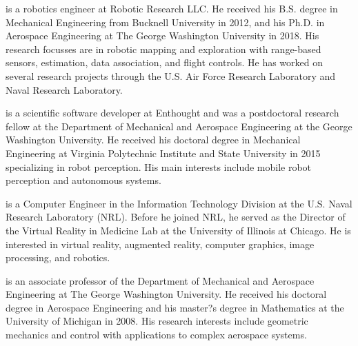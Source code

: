 \documentclass[smallextended]{svjour3}       %
\begin{document}



\vspace*{0.1\textwidth}

 is a robotics engineer at Robotic Research LLC. He received his B.S. degree in Mechanical Engineering from Bucknell University in 2012, and his Ph.D. in Aerospace Engineering at The George Washington University in 2018. His research focusses are in robotic mapping and exploration with range-based sensors, estimation, data association, and flight controls. He has worked on several research projects through the U.S. Air Force Research Laboratory and Naval Research Laboratory.

\vspace*{0.1\textwidth}

 is a scientific software developer at Enthought and was a postdoctoral research fellow at the Department of Mechanical and Aerospace Engineering at the George Washington University. He received his doctoral degree in Mechanical Engineering at Virginia Polytechnic Institute and State University in 2015 specializing in robot perception. His main interests include mobile robot perception and autonomous systems.


\vspace*{0.1\textwidth}

 is a Computer Engineer in the Information Technology Division at the U.S. Naval Research Laboratory (NRL). Before he joined NRL, he served as the Director of the Virtual Reality in Medicine Lab at the University of Illinois at Chicago. He is interested in virtual reality, augmented reality, computer graphics, image processing, and robotics.

\vspace*{0.1\textwidth}

 is an associate professor of the Department of Mechanical and Aerospace Engineering at The George Washington University. He received his doctoral degree in Aerospace Engineering and his master?s degree in Mathematics at the University of Michigan in 2008. His research interests include geometric mechanics and control with applications to complex aerospace systems.
\end{document}
